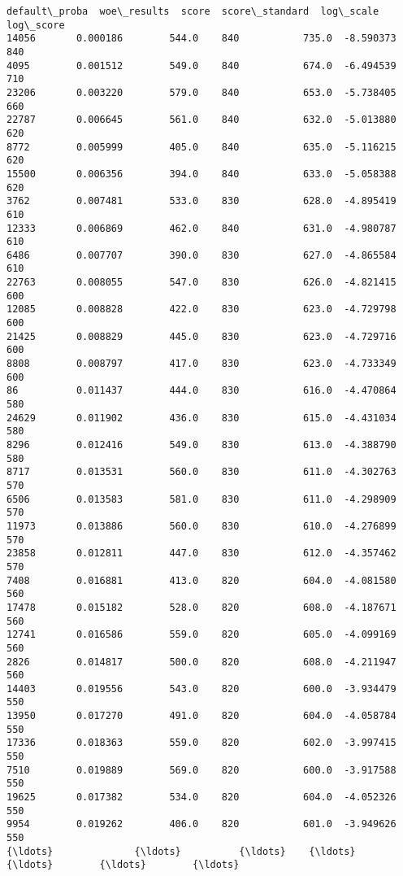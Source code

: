 \documentclass[11pt]{article}
\begin{document}
    \begin{Verbatim}[commandchars=\\\{\}]
       default\_proba  woe\_results  score  score\_standard  log\_scale  log\_score
14056       0.000186        544.0    840           735.0  -8.590373        840
4095        0.001512        549.0    840           674.0  -6.494539        710
23206       0.003220        579.0    840           653.0  -5.738405        660
22787       0.006645        561.0    840           632.0  -5.013880        620
8772        0.005999        405.0    840           635.0  -5.116215        620
15500       0.006356        394.0    840           633.0  -5.058388        620
3762        0.007481        533.0    830           628.0  -4.895419        610
12333       0.006869        462.0    840           631.0  -4.980787        610
6486        0.007707        390.0    830           627.0  -4.865584        610
22763       0.008055        547.0    830           626.0  -4.821415        600
12085       0.008828        422.0    830           623.0  -4.729798        600
21425       0.008829        445.0    830           623.0  -4.729716        600
8808        0.008797        417.0    830           623.0  -4.733349        600
86          0.011437        444.0    830           616.0  -4.470864        580
24629       0.011902        436.0    830           615.0  -4.431034        580
8296        0.012416        549.0    830           613.0  -4.388790        580
8717        0.013531        560.0    830           611.0  -4.302763        570
6506        0.013583        581.0    830           611.0  -4.298909        570
11973       0.013886        560.0    830           610.0  -4.276899        570
23858       0.012811        447.0    830           612.0  -4.357462        570
7408        0.016881        413.0    820           604.0  -4.081580        560
17478       0.015182        528.0    820           608.0  -4.187671        560
12741       0.016586        559.0    820           605.0  -4.099169        560
2826        0.014817        500.0    820           608.0  -4.211947        560
14403       0.019556        543.0    820           600.0  -3.934479        550
13950       0.017270        491.0    820           604.0  -4.058784        550
17336       0.018363        559.0    820           602.0  -3.997415        550
7510        0.019889        569.0    820           600.0  -3.917588        550
19625       0.017382        534.0    820           604.0  -4.052326        550
9954        0.019262        406.0    820           601.0  -3.949626        550
{\ldots}              {\ldots}          {\ldots}    {\ldots}             {\ldots}        {\ldots}        {\ldots}

\end{Verbatim}
\end{document}
